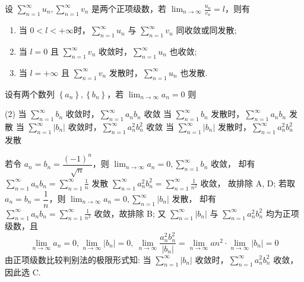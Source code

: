 \begin{theorem}[比较审敛法的极限形式]
    设 $\displaystyle  \sum_{n=1}^{\infty} u_{n}, \sum_{n=1}^{\infty} v_{n} $ 是两个正项级数，若 $\displaystyle  \lim _{n \rightarrow \infty} \frac{u_{n}}{v_{n}}=l $，则有
    \begin{enumerate}[label=(\arabic{*})]
        \item 当 $ 0<l<+\infty  $时，$\displaystyle \sum_{n=1}^{\infty} u_{n} $ 与 $\displaystyle  \sum_{n=1}^{\infty} v_{n} $ 同收敛或同发散;
        \item 当 $ l=0 $ 且 $\displaystyle  \sum_{n=1}^{\infty} v_{n} $ 收敛时，$\displaystyle  \sum_{n=1}^{\infty} u_{n} $ 也收敛;
        \item 当 $ l=+\infty $ 且 $\displaystyle  \sum_{n=1}^{\infty} v_{n} $ 发散时，$\displaystyle \sum_{n=1}^{\infty} u_{n} $ 也发散.
    \end{enumerate}
\end{theorem}

\begin{example}[2009 数一]
    设有两个数列 $ \left\{a_{n}\right\},\left\{b_{n}\right\}$，若 $\displaystyle \lim _{n \to \infty} a_{n}=0 $ 则
    \begin{tasks}(2)
        \task 当 $\displaystyle \sum_{n=1}^{\infty} b_{n} $ 收敛时，$\displaystyle \sum_{n=1}^{\infty} a_{n} b_{n} $ 收敛
        \task 当 $\displaystyle \sum_{n=1}^{\infty} b_{n} $ 发散时，$\displaystyle \sum_{n=1}^{\infty} a_{n} b_{n} $ 发散
        \task 当 $\displaystyle \sum_{n=1}^{\infty}\left|b_{n}\right| $ 收敛时，$\displaystyle \sum_{n=1}^{\infty} a_{n}^{2} b_{n}^{2} $ 收敛
        \task 当 $\displaystyle \sum_{n=1}^{\infty}\left|b_{n}\right| $ 发散时，$\displaystyle \sum_{n=1}^{\infty} a_{n}^{2} b_{n}^{2} $ 发散
    \end{tasks}
\end{example}
\begin{solution}
    若令 $ a_{n}=b_{n}=\dfrac{(-1)^{n}}{\sqrt{n}}$，则 $\displaystyle \lim _{n \rightarrow \infty} a_{n}=0, \sum_{n=1}^{\infty} b_{n} $ 收敛，
    却有 $\displaystyle  \sum_{n=1}^{\infty} a_{n} b_{n}=\sum_{n=1}^{\infty} \frac{1}{n} $ 发散 $\displaystyle \sum_{n=1}^{\infty} a_{n}^{2} b_{n}^{2}=\sum_{n=1}^{\infty} \frac{1}{n^{2}} $ 收敛，
    故排除 A, D;
    若取 $ a_{n}=b_{n}=\dfrac{1}{n} $，则 $\displaystyle  \lim _{n \rightarrow \infty} a_{n}=0, \sum_{n=1}^{\infty}\left|b_{n}\right| $ 发散，
    却有 $\displaystyle \sum_{n=1}^{\infty} a_{n} b_{n}=\sum_{n=1}^{\infty} \frac{1}{n^{2}} $ 收敛，故排除 B;
    又 $\displaystyle \sum_{n=1}^{\infty}\left|b_{n}\right| $ 与 $\displaystyle \sum_{n=1}^{\infty} a_{n}^{2} b_{n}^{2} $ 均为正项级数，且
    $$\displaystyle\lim _{n \rightarrow \infty} a_{n}=0, \lim _{n \rightarrow \infty}\left|b_{n}\right|=0 ,~\lim_{n\to\infty}\dfrac{a_n^2b_n^2}{|b_n|}=\lim_{n\to\infty}an^2\cdot\lim_{n\to\infty}|b_n|=0$$
    由正项级数比较判别法的极限形式知: 当 $\displaystyle\sum_{n=1}^{\infty}|b_n|$ 收敛时，$\displaystyle\sum_{n=1}^{\infty}a_n^2b_n^2$ 收敛，因此选 C.
\end{solution}

